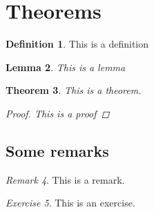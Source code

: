 \documentclass[oneside]{book}
\theoremstyle{plain}
\newtheorem{theo}{Theorem}%
\newtheorem{lem}[theo]{Lemma}
\theoremstyle{definition}
\newtheorem{defn}[theo]{Definition}
\theoremstyle{remark}
\newtheorem{rmk}[theo]{Remark}
\theoremstyle{mystyle}
\newtheorem{exc}[theo]{Exercise}
\begin{document}
\section{Theorems}

%
%

\begin{defn}
This is a definition
\end{defn}

\begin{lem}
This is a lemma
\end{lem}

\begin{theo}
This is a theorem.
\begin{proof}
This is a proof
\end{proof}
\end{theo}

\subsection{Some remarks}

\begin{rmk}
This is a remark.
\end{rmk}

\begin{exc}
This is an exercise.
\end{exc}


\thechapter
\end{document}
